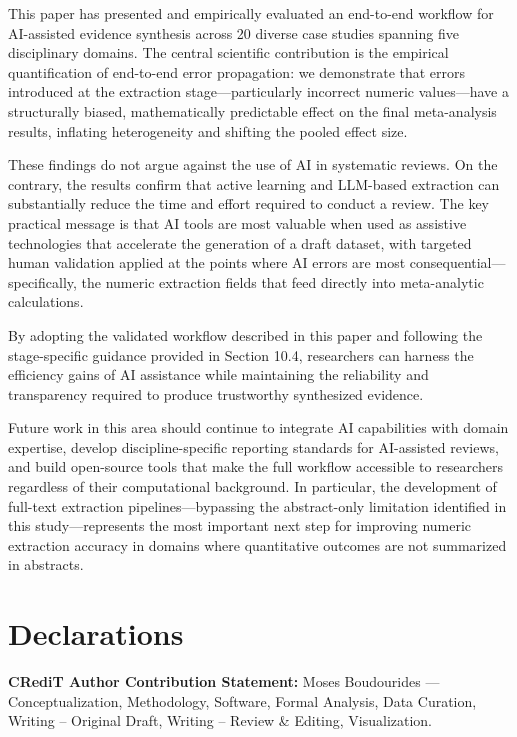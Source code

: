 \documentclass[12pt]{article}
\begin{document}
This paper has presented and empirically evaluated an end-to-end workflow for AI-assisted evidence synthesis across 20 diverse case studies spanning five disciplinary domains. The central scientific contribution is the empirical quantification of end-to-end error propagation: we demonstrate that errors introduced at the extraction stage---particularly incorrect numeric values---have a structurally biased, mathematically predictable effect on the final meta-analysis results, inflating heterogeneity and shifting the pooled effect size.

These findings do not argue against the use of AI in systematic reviews. On the contrary, the results confirm that active learning and LLM-based extraction can substantially reduce the time and effort required to conduct a review. The key practical message is that AI tools are most valuable when used as assistive technologies that accelerate the generation of a draft dataset, with targeted human validation applied at the points where AI errors are most consequential---specifically, the numeric extraction fields that feed directly into meta-analytic calculations.

By adopting the validated workflow described in this paper and following the stage-specific guidance provided in Section 10.4, researchers can harness the efficiency gains of AI assistance while maintaining the reliability and transparency required to produce trustworthy synthesized evidence.

Future work in this area should continue to integrate AI capabilities with domain expertise, develop discipline-specific reporting standards for AI-assisted reviews, and build open-source tools that make the full workflow accessible to researchers regardless of their computational background. In particular, the development of full-text extraction pipelines---bypassing the abstract-only limitation identified in this study---represents the most important next step for improving numeric extraction accuracy in domains where quantitative outcomes are not summarized in abstracts.




\section*{Declarations}

\textbf{CRediT Author Contribution Statement:}
Moses Boudourides --- Conceptualization, Methodology, Software, Formal Analysis, Data Curation, Writing -- Original Draft, Writing -- Review \& Editing, Visualization.
\end{document}
